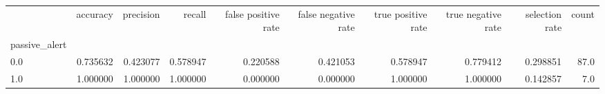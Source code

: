 \begin{tabular}{lrrrrrrrrr}
\toprule
{} &  accuracy &  precision &    recall &  false positive rate &  false negative rate &  true positive rate &  true negative rate &  selection rate &  count \\
passive\_alert &           &            &           &                      &                      &                     &                     &                 &        \\
\midrule
0.0           &  0.735632 &   0.423077 &  0.578947 &             0.220588 &             0.421053 &            0.578947 &            0.779412 &        0.298851 &   87.0 \\
1.0           &  1.000000 &   1.000000 &  1.000000 &             0.000000 &             0.000000 &            1.000000 &            1.000000 &        0.142857 &    7.0 \\
\bottomrule
\end{tabular}
